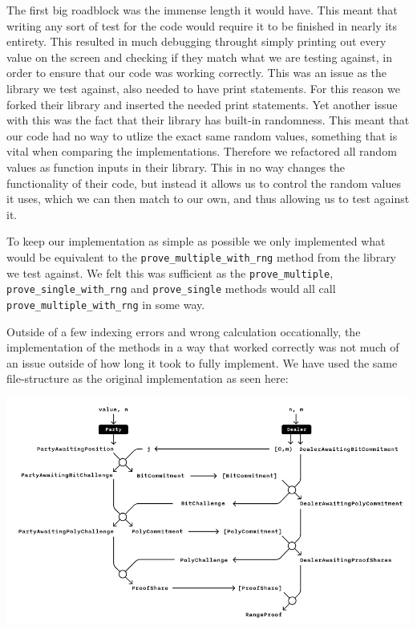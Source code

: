 \documentclass{article}
\begin{document}
The first big roadblock was the immense length it would have. This
meant that writing any sort of test for the code would require it to
be finished in nearly its entirety. This resulted in much debugging
throught simply printing out every value on the screen and checking if
they match what we are testing against, in order to ensure that our code
was working correctly. This was an issue as the library we test against,
also needed to have print statements. For this reason we forked their
library and inserted the needed print statements. Yet another issue
with this was the fact that their library has built-in randomness. This
meant that our code had no way to utlize the exact same random values,
something that is vital when comparing the implementations. Therefore we
refactored all random values as function inputs in their library. This
in no way changes the functionality of their code, but instead it
allows us to control the random values it uses, which we can then
match to our own, and thus allowing us to test against it.

To keep our implementation as simple as possible we only implemented
what would be equivalent to the \texttt{prove\_multiple\_with\_rng}
method from the library we test against. We felt this was sufficient
as the \texttt{prove\_multiple}, \texttt{prove\_single\_with\_rng}
and \texttt{prove\_single} methods would all call
\texttt{prove\_multiple\_with\_rng} in some way.

Outside of a few indexing errors and wrong calculation occationally,
the implementation of the methods in a way that worked correctly
was not much of an issue outside of how long it took to fully
implement. We have used the same file-structure as the original 
implementation as seen here:

\includegraphics[scale=0.505]{img/multi-party protocol.png}
\end{document}

